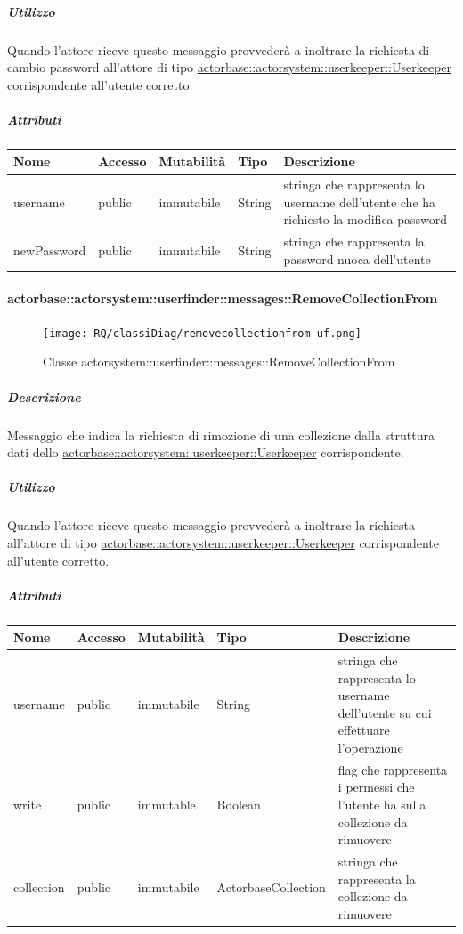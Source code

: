 \documentclass{scalatekids-article}
\begin{document}
\subparagraph{Utilizzo}
Quando l'attore riceve questo messaggio provvederà a inoltrare la richiesta di cambio password all'attore di tipo \hyperref[sec:actorbase::actorsystem::userkeeper::Userkeeper]{actorbase::\allowbreak{}actorsystem::\allowbreak{}userkeeper::\allowbreak{}Userkeeper}
corrispondente all'utente corretto.

\subparagraph{Attributi}
\begin{tabular}{| p{3cm} | p{1.5cm} | p{2cm} | p{2cm} | p{8.5cm} |}
  \hline
  Nome & Accesso & Mutabilità & Tipo & Descrizione\\
  \hline
  username & public & immutabile & String & stringa che rappresenta lo username dell'utente che ha richiesto la modifica password \\
  \hline
  newPassword & public & immutabile & String & stringa che rappresenta la password nuoca dell'utente \\
  \hline
\end{tabular}

\paragraph{actorbase::actorsystem::userfinder::messages::RemoveCollectionFrom}
\label{sec:actorbase::actorsystem::userfinder::messages::RemoveCollectionFrom}

\begin{figure}[H]
   \begin{center}
     \texttt{[image: RQ/classiDiag/removecollectionfrom-uf.png]}
     \caption{Classe actorsystem::userfinder::messages::RemoveCollectionFrom}
   \end{center}
 \end{figure}

\subparagraph{Descrizione}
Messaggio che indica la richiesta di rimozione di una collezione dalla struttura dati dello \hyperref[sec:actorbase::actorsystem::userkeeper::Userkeeper]{actorbase::\allowbreak{}actorsystem::\allowbreak{}userkeeper::\allowbreak{}Userkeeper} corrispondente.

\subparagraph{Utilizzo}
Quando l'attore riceve questo messaggio provvederà a inoltrare la richiesta
all'attore di tipo \hyperref[sec:actorbase::actorsystem::userkeeper::Userkeeper]{actorbase::\allowbreak{}actorsystem::\allowbreak{}userkeeper::\allowbreak{}Userkeeper}
corrispondente all'utente corretto.

\subparagraph{Attributi}
\begin{tabular}{| p{3cm} | p{1.5cm} | p{2cm} | p{2cm} | p{8.5cm} |}
  \hline
  Nome & Accesso & Mutabilità & Tipo & Descrizione\\
  \hline
  username & public & immutabile & String & stringa che rappresenta lo username dell'utente su cui effettuare l'operazione \\
  \hline
  write & public & immutable & Boolean & flag che rappresenta i permessi che l'utente ha sulla collezione da rimuovere \\
  \hline
  collection & public & immutabile & ActorbaseCollection & stringa che rappresenta la collezione da rimuovere \\
  \hline
\end{tabular}
\end{document}
